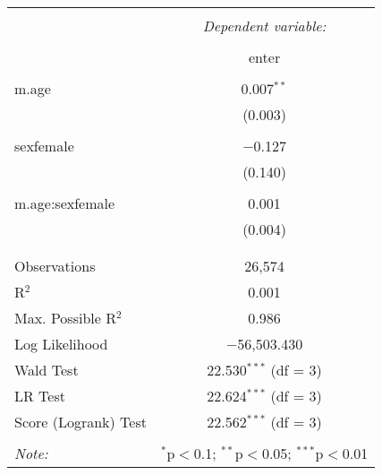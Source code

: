 
\begin{table}[!htbp] \centering 
  \caption{} 
  \label{} 
\begin{tabular}{@{\extracolsep{5pt}}lc} 
\\[-1.8ex]\hline 
\hline \\[-1.8ex] 
 & \multicolumn{1}{c}{\textit{Dependent variable:}} \\ 
\cline{2-2} 
\\[-1.8ex] & enter \\ 
\hline \\[-1.8ex] 
 m.age & 0.007$^{**}$ \\ 
  & (0.003) \\ 
  & \\ 
 sexfemale & $-$0.127 \\ 
  & (0.140) \\ 
  & \\ 
 m.age:sexfemale & 0.001 \\ 
  & (0.004) \\ 
  & \\ 
\hline \\[-1.8ex] 
Observations & 26,574 \\ 
R$^{2}$ & 0.001 \\ 
Max. Possible R$^{2}$ & 0.986 \\ 
Log Likelihood & $-$56,503.430 \\ 
Wald Test & 22.530$^{***}$ (df = 3) \\ 
LR Test & 22.624$^{***}$ (df = 3) \\ 
Score (Logrank) Test & 22.562$^{***}$ (df = 3) \\ 
\hline 
\hline \\[-1.8ex] 
\textit{Note:}  & \multicolumn{1}{r}{$^{*}$p$<$0.1; $^{**}$p$<$0.05; $^{***}$p$<$0.01} \\ 
\end{tabular} 
\end{table}  
